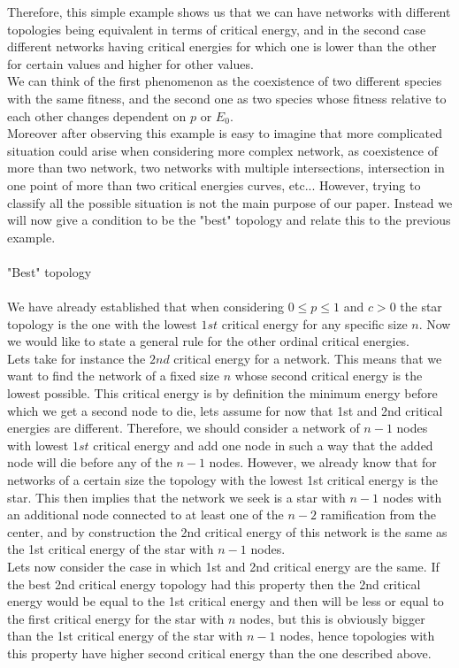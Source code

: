 \documentclass{amsart}
\theoremstyle{plain}
\numberwithin{equation}{section}
\begin{document}
Therefore, this simple example shows us that we can have networks with different topologies being equivalent in terms of critical energy, and in the second case different networks having critical energies for which one is lower than the other for certain values and higher for other values.\\
We can think of the first phenomenon as the coexistence of two different species with the same fitness, and the second one as two species whose fitness relative to each other changes dependent on $p$ or $E_0$.\\Moreover after observing this example is easy to imagine that more complicated situation could arise when considering more complex network, as coexistence of more than two network, two networks with multiple intersections, intersection in one point of more than two critical energies curves, etc... However, trying to classify all the possible situation is not the main purpose of our paper. Instead we will now give a condition to be the "best" topology and relate this to the previous example.\\
\\
"Best" topology\\
\\
We have already established that when considering $0\leq p\leq 1$ and $c>0$ the star topology is the one with the lowest $1st$ critical energy for any specific size $n$. Now we would like to state a general rule for the other ordinal critical energies.\\
Lets take for instance the $2nd$ critical energy for a network. This means that we want to find the network of a fixed size $n$ whose second critical energy is the lowest possible. This critical energy is by definition the minimum energy before which we get a second node to die, lets assume for now that 1st and 2nd critical energies are different. Therefore, we should consider a network of $n-1$ nodes with lowest $1st$ critical energy and add one node in such a way that the added node will die before any of the $n-1$ nodes. However, we already know that for networks of a certain size the topology with the lowest 1st critical energy is the star. This then implies that the network we seek is a star with $n-1$ nodes with an additional node connected to at least one of the $n-2$ ramification from the center, and by construction the 2nd critical energy of this network is the same as the 1st critical energy of the star with $n-1$ nodes.\\
Lets now consider the case in which 1st and 2nd critical energy are the same. If the best 2nd critical energy topology had this property then the 2nd critical energy would be equal to the 1st critical energy and then will be less or equal to the first critical energy for the star with $n$ nodes, but this is obviously bigger than the 1st critical energy of the star with $n-1$ nodes, hence topologies with this property have higher second critical energy than the one described above.\\
\end{document}
